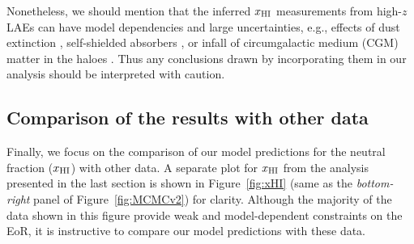\documentclass[useAMS,usenatbib]{mnras}
\begin{document}
Nonetheless, we should mention that the inferred $x_{\rm HI}$ measurements from high-$z$ LAEs
can have model dependencies and large uncertainties, e.g., effects of dust extinction
\citep{dayal1}, self-shielded absorbers \citep{2013MNRAS.429.1695B,2015MNRAS.452..261C,
2016MNRAS.463.4019K,2018arXiv180303789W}, or infall of circumgalactic medium (CGM) matter in the haloes
\citep{2017ApJ...839...44S,2018arXiv180303789W}. Thus any conclusions drawn by incorporating
them in our analysis should be interpreted with caution.

\subsection{Comparison of the results with other data}
\label{sec:comparison}

Finally, we focus on the comparison of our model predictions for the neutral fraction
($x_{\rm HI}$) with other data. A separate plot for $x_{\rm HI}$ from the analysis presented
in the last section is shown in Figure~\ref{fig:xHI} (same as the {\it bottom-right}
panel of Figure~\ref{fig:MCMCv2}) for clarity. Although the majority of the data shown 
in this figure provide weak and model-dependent constraints on 
the EoR, it is instructive to compare our model predictions with these data.
\end{document}
